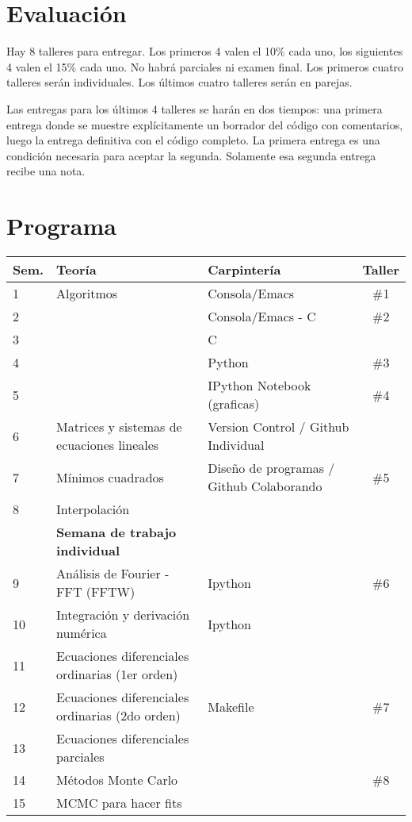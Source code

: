 \documentclass[12pt]{article}
\begin{document}
\section*{Evaluaci\'on}

Hay 8 talleres para entregar. Los primeros 4 valen el 10\% cada uno, los siguientes 4 valen el 15\% cada uno. No habr\'a parciales ni examen final. Los primeros cuatro talleres ser\'an individuales. Los \'ultimos cuatro talleres ser\'an en parejas. 

Las entregas para los \'ultimos 4 talleres se har\'an en dos tiempos: una primera entrega donde se muestre expl\'icitamente un borrador del c\'odigo con comentarios, luego la entrega definitiva con el c\'odigo completo. La primera entrega es una condici\'on necesaria para aceptar la segunda. Solamente esa segunda entrega recibe una nota.

 \newpage
\section*{Programa}

\begin{center}
\begin{tabular}{|p{1cm}|p{6cm}|p{5cm}|c|}
\hline
Sem. & Teor\'ia & Carpinter\'ia & Taller \\\hline
1 & Algoritmos	&Consola/Emacs & \#1\\
2 & 	& Consola/Emacs - C  & \#2\\
3 & 	&C  &    \\
4 & 	&Python & \#3\\
5 & 	&IPython Notebook (graficas) & \#4 \\
6 & Matrices y sistemas de ecuaciones lineales  & Version Control / Github Individual &\\
7 & M\'inimos cuadrados & Dise\~no de programas / Github Colaborando & \#5\\
8 & Interpolaci\'on & & \\
 & {\bf Semana de trabajo individual} & &\\
9 & An\'alisis de Fourier - FFT  (FFTW)&  Ipython & \#6 \\
10 & Integraci\'on y derivaci\'on num\'erica & Ipython &\\
11 & Ecuaciones diferenciales ordinarias (1er orden)&  &\\
12 & Ecuaciones diferenciales ordinarias (2do orden)&  Makefile & \#7 \\
13 & Ecuaciones diferenciales parciales &  & \\
14 & M\'etodos Monte Carlo &   & \#8 \\
15 & MCMC para hacer fits &    & \\

\hline
\end{tabular}
\end{center}
\end{document}
